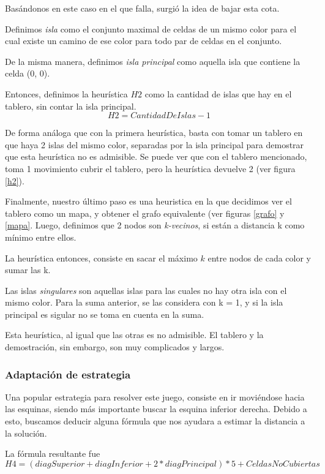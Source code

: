 \documentclass{article}
\begin{document}
Bas\'andonos en este caso en el que falla, surgi\'o la idea de bajar esta cota.

Definimos \emph{isla} como el conjunto maximal de celdas de un mismo color para el cual existe un camino de ese color para todo par de celdas en el conjunto.

De la misma manera, definimos \emph{isla principal} como aquella isla que contiene la celda (0, 0).

Entonces, definimos la heur\'istica $H2$ como la cantidad de islas que hay en el tablero, sin contar la isla principal.
\[
H2 = CantidadDeIslas - 1
\]

De forma an\'aloga que con la primera heur\'istica, basta con tomar un tablero en que haya 2 islas del mismo color, separadas por la isla principal para demostrar que esta heur\'istica no es admisible. Se puede ver que con el tablero mencionado, toma 1 movimiento cubrir el tablero, pero la heur\'istica devuelve 2 (ver figura \ref{h2}).


Finalmente, nuestro \'ultimo paso es una heuristica en la que decidimos ver el tablero como un mapa, y obtener el grafo equivalente (ver figuras \ref{grafo} y \ref{mapa}.
Luego, definimos que 2 nodos son \emph{k-vecinos}, si est\'an a distancia k como m\'inimo entre ellos.

La heur\'istica entonces, consiste en sacar el m\'aximo $k$ entre nodos de cada color y sumar las k.

Las islas \emph{singulares} son aquellas islas para las cuales no hay otra isla con el mismo color. Para la suma anterior, se las considera con k = 1, y si la isla principal es sigular no se toma en cuenta en la suma.

Esta heur\'istica, al igual que las otras es no admisible. El tablero y la demostraci\'on, sin embargo, son muy complicados y largos.

\subsubsection{Adaptaci\'on de estrategia}

Una popular estrategia para resolver este juego, consiste en ir movi\'endose hacia las esquinas, siendo m\'as importante buscar la esquina inferior derecha. Debido a esto, buscamos deducir alguna f\'ormula que nos ayudara a estimar la distancia a la soluci\'on.

La f\'ormula resultante fue
\[
H4 = (diagSuperior + diagInferior + 2 * diagPrincipal) * 5 + CeldasNoCubiertas
\]
\end{document}
